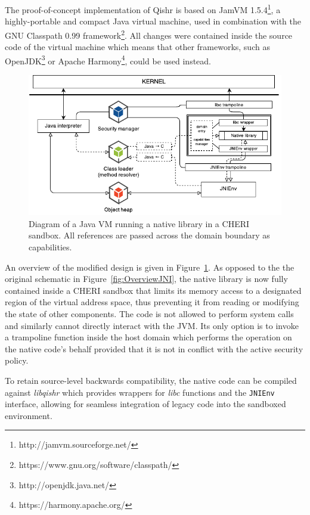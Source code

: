 \documentclass[a4paper,12pt,twoside,openright]{report}
\newcommand{\tool}[1]{\emph{#1}}
\newcommand{\lib}[1]{\tool{lib#1}}
\begin{document}
The proof-of-concept implementation of Qishr is based on JamVM 1.5.4\footnote{http://jamvm.sourceforge.net/}, a highly-portable and compact Java virtual machine, used in combination with the GNU Classpath 0.99 framework\footnote{https://www.gnu.org/software/classpath/}. All changes were contained inside the source code of the virtual machine which means that other frameworks, such as OpenJDK\footnote{http://openjdk.java.net/} or Apache Harmony\footnote{https://harmony.apache.org/}, could be used instead.

\begin{figure}
	\includegraphics[width=\textwidth]{dia_jni_caps.pdf}
	\caption{Diagram of a Java VM running a native library in a CHERI sandbox. All references are passed across the domain boundary as capabilities.}
	\label{fig:OverviewCheriJNI}
\end{figure}

An overview of the modified design is given in Figure~\ref{fig:OverviewCheriJNI}. As opposed to the the original schematic in Figure~\ref{fig:OverviewJNI}, the native library is now fully contained inside a CHERI sandbox that limits its memory access to a designated region of the virtual address space, thus preventing it from reading or modifying the state of other components. The code is not allowed to perform system calls and similarly cannot directly interact with the JVM. Its only option is to invoke a trampoline function inside the host domain which performs the operation on the native code's behalf provided that it is not in conflict with the active security policy.

To retain source-level backwards compatibility, the native code can be compiled against \lib{qishr} which provides wrappers for \lib{c} functions and the \texttt{JNIEnv} interface, allowing for seamless integration of legacy code into the sandboxed environment.
\end{document}
